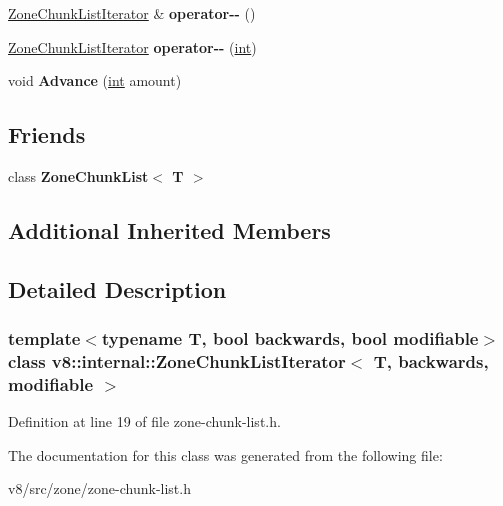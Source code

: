 \begin{DoxyCompactItemize}
\mbox{\hyperlink{classv8_1_1internal_1_1ZoneChunkListIterator}{Zone\+Chunk\+List\+Iterator}} \& {\bfseries operator-\/-\/} ()
\item 
\mbox{\label{classv8_1_1internal_1_1ZoneChunkListIterator_a3f0efe59bd884d6164d4f223eca578dd}} 
\mbox{\hyperlink{classv8_1_1internal_1_1ZoneChunkListIterator}{Zone\+Chunk\+List\+Iterator}} {\bfseries operator-\/-\/} (\mbox{\hyperlink{classint}{int}})
\item 
\mbox{\label{classv8_1_1internal_1_1ZoneChunkListIterator_a3b8f82844c33abeb8f9ffce7ba6e7cf6}} 
void {\bfseries Advance} (\mbox{\hyperlink{classint}{int}} amount)
\end{DoxyCompactItemize}
\subsection*{Friends}
\begin{DoxyCompactItemize}
\item 
\mbox{\label{classv8_1_1internal_1_1ZoneChunkListIterator_a36a36b8c0bd74e79d71770798d5f2a92}} 
class {\bfseries Zone\+Chunk\+List$<$ T $>$}
\end{DoxyCompactItemize}
\subsection*{Additional Inherited Members}


\subsection{Detailed Description}
\subsubsection*{template$<$typename T, bool backwards, bool modifiable$>$\newline
class v8\+::internal\+::\+Zone\+Chunk\+List\+Iterator$<$ T, backwards, modifiable $>$}



Definition at line 19 of file zone-\/chunk-\/list.\+h.



The documentation for this class was generated from the following file\+:\begin{DoxyCompactItemize}
\item 
v8/src/zone/zone-\/chunk-\/list.\+h\end{DoxyCompactItemize}
